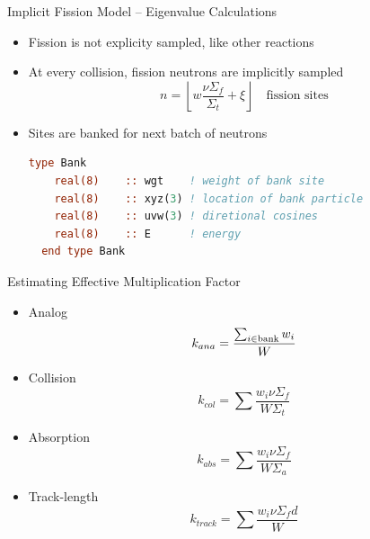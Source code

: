 \documentclass[serif]{beamer}
\begin{document}

\begin{frame}[fragile]{Implicit Fission Model -- Eigenvalue Calculations}

\begin{itemize}

  \item Fission is not explicity sampled, like other reactions\vfill
  \item At every collision, fission neutrons are implicitly sampled\vfill
  \begin{equation*}
     n = \left \lfloor w \frac{\nu\Sigma_f}{\Sigma_t} + \xi \right
     \rfloor \quad \text{fission sites}
  \end{equation*} \vfill
  \item Sites are banked for next batch of neutrons\vfill
  \begin{lstlisting}[language=Fortran,frame=single,backgroundcolor=\color{gray!20}]
  type Bank
    real(8)    :: wgt    ! weight of bank site
    real(8)    :: xyz(3) ! location of bank particle
    real(8)    :: uvw(3) ! diretional cosines
    real(8)    :: E      ! energy
  end type Bank
  \end{lstlisting} 
\end{itemize}

\end{frame}


\begin{frame}{Estimating Effective Multiplication Factor}

  \begin{itemize}

    \item Analog
\[
    k_{ana} = \frac{\sum_{i\in\rm{bank}}w_i}{W}
\]
    \item Collision
\[
    k_{col} = \sum\frac{w_i\nu\Sigma_{f}}{W\Sigma_{t}}
\]
    \item Absorption
\[
    k_{abs} = \sum\frac{w_i\nu\Sigma_{f}}{W\Sigma_{a}}
\]
    \item Track-length
\[
    k_{track} = \sum\frac{w_i\nu\Sigma_{f}d}{W}
\]
  \end{itemize}

\end{frame}

\end{document}
